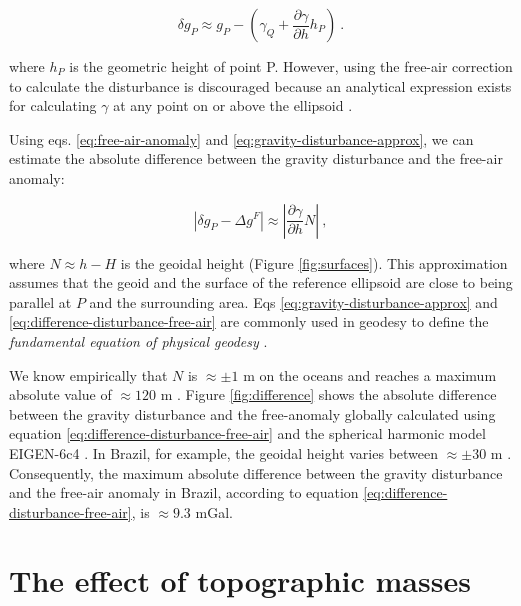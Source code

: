 \documentclass[manuscript]{geophysics}
\begin{document}
\begin{equation}
\delta g_{P} \approx g_{P} -
\left( \gamma_{Q} + \frac{\partial \gamma}{\partial h} h_P \right) \: .
\label{eq:gravity-disturbance-approx}
\end{equation}

\noindent
where $h_P$ is the geometric height of point P.
However, using the free-air correction to calculate the disturbance is
discouraged because an analytical expression exists for calculating $\gamma$ at
any point on or above the ellipsoid \citep{li2001}.

Using eqs. \ref{eq:free-air-anomaly} and \ref{eq:gravity-disturbance-approx},
we can estimate the absolute difference between the gravity disturbance and the
free-air anomaly:

\begin{equation}
\left\vert \delta g_{P} - \Delta g^{F} \right\vert \approx
\left\vert \frac{\partial \gamma}{\partial h} N \right\vert \: ,
\label{eq:difference-disturbance-free-air}
\end{equation}

\noindent
where $N \approx h - H$ is the geoidal height (Figure \ref{fig:surfaces}).
This approximation assumes that the geoid and the surface of
the reference ellipsoid are close to being parallel at $P$
and the surrounding area.
Eqs \ref{eq:gravity-disturbance-approx}
and \ref{eq:difference-disturbance-free-air} are commonly used
in geodesy to define the \textit{fundamental equation of physical
	geodesy} \citep{hofmann-wellenhof-moritz2005}.

We know empirically that $N$ is $\approx \pm 1$ m on the oceans
and reaches a maximum absolute value of $\approx 120$ m
\citep[e.g.,][]{torge2012, sanso_sideris2013}.
Figure \ref{fig:difference} shows the absolute difference between the
gravity disturbance and the free-anomaly globally calculated
using equation \ref{eq:difference-disturbance-free-air} and the spherical harmonic
model EIGEN-6c4 \citep{forste2014}.
In Brazil, for example, the geoidal height
varies between $\approx \pm 30$ m \citep{ibge_mapgeo2015}.
Consequently,
the maximum absolute difference between the gravity disturbance and
the free-air anomaly in Brazil,
according to equation \ref{eq:difference-disturbance-free-air},
is $\approx 9.3$ mGal.


\section{The effect of topographic masses}
\end{document}
